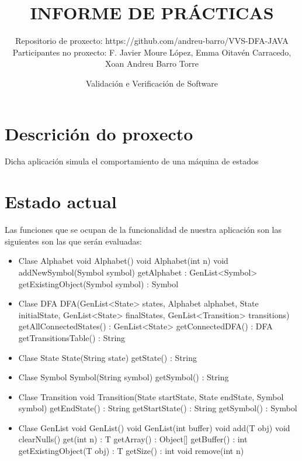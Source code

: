 \documentclass[DIV=calc,paper=a4,fontsize=11pt,onecolumn]{scrartcl} %
\title{INFORME DE PRÁCTICAS} %
\author{Repositorio de proxecto: https://github.com/andreu-barro/VVS-DFA-JAVA \\
        Participantes no proxecto: F. Javier Moure López, Emma Oitavén Carracedo, Xoan Andreu Barro Torre}
\date{\sffamily Validación e Verificación de Software} %
\begin{document}
\maketitle %
\thispagestyle{fancy} %
\clearpage


\section{Descrición do proxecto}

Dicha aplicación simula el comportamiento de una máquina de estados

\section{Estado actual}

	Las funciones que se ocupan de la funcionalidad de nuestra aplicación son las siguientes son las que serán evaluadas:
	\begin{itemize}
		\item Clase Alphabet
		\subitem void Alphabet()
		\subitem void Alphabet(int n)
		\subitem void addNewSymbol(Symbol symbol) 
		\subitem getAlphabet : GenList<Symbol>
		\subitem getExistingObject(Symbol symbol) : Symbol
		\item Clase DFA
		\subitem DFA(GenList<State> states, Alphabet alphabet, State initialState, GenList<State> finalStates, GenList<Transition> transitions)
		\subitem getAllConnectedStates() : GenList<State>
		\subitem getConnectedDFA() : DFA
		\subitem getTransitionsTable() : String
		\item Clase State
		\subitem State(String state)
		\subitem getState() : String
		\item Clase Symbol
		\subitem Symbol(String symbol)
		\subitem getSymbol() : String
		\item Clase Transition
		\subitem void Transition(State startState, State endState, Symbol symbol)
		\subitem getEndState() : String
		\subitem getStartState() : String
		\subitem getSymbol() : Symbol
		\item Clase GenList
		\subitem void GenList()
		\subitem void GenList(int buffer)
		\subitem void add(T obj)
		\subitem void clearNulls()
		\subitem get(int n) : T
		\subitem getArray() : Object[]
		\subitem getBuffer() : int
		\subitem getExistingObject(T obj) : T
		\subitem getSize() : int
		\subitem void remove(int n)
	\end{itemize}
	
\end{document}
